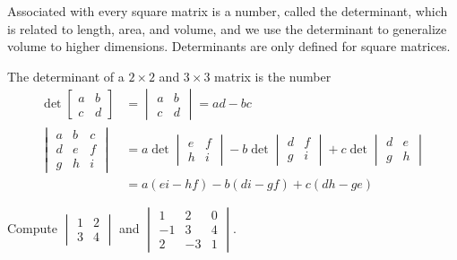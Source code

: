 Associated with every square matrix is a number, called the determinant, which is related to length, area, and volume, and we use the determinant to generalize volume to higher dimensions. Determinants are only defined for square matrices.
\begin{definition}
The determinant of a {$2\times 2$} and {$3\times 3$} matrix is the number 
\begin{align*}
\det\begin{bmatrix}a&b\\c&d\end{bmatrix} &=\begin{vmatrix}a&b\\c&d\end{vmatrix} = ad-bc\\
\begin{vmatrix}a&b&c\\d&e&f\\g&h&i\end{vmatrix} &= a\det\begin{vmatrix}e&f\\h&i\end{vmatrix} -b\det\begin{vmatrix}d&f\\g&i\end{vmatrix} +c\det\begin{vmatrix}d&e\\g&h\end{vmatrix}\\
&=a(ei-hf)-b(di-gf)+c(dh-ge)
\end{align*}
\end{definition}

\begin{problem}
Compute 
$\begin{vmatrix}
1&2\\
3&4
\end{vmatrix} 
$
and 
$\begin{vmatrix}
1&2&0\\
-1&3&4\\
2&-3&1
\end{vmatrix} 
$.
\end{problem}

